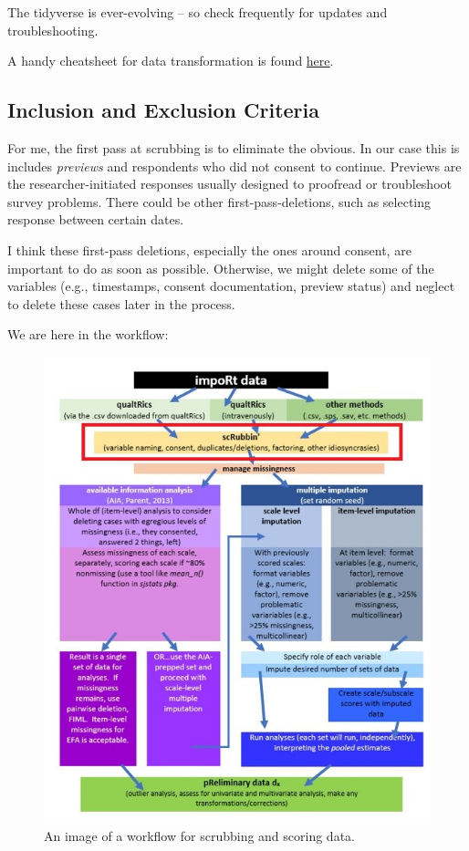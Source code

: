 \documentclass[
  11pt,
]{book}
\begin{document}
The tidyverse is ever-evolving -- so check frequently for updates and troubleshooting.

A handy cheatsheet for data transformation is found \href{https://www.rstudio.com/wp-content/uploads/2015/02/data-wrangling-cheatsheet.pdf}{here}.

\hypertarget{inclusion-and-exclusion-criteria}{%
\subsection{Inclusion and Exclusion Criteria}\label{inclusion-and-exclusion-criteria}}

For me, the first pass at scrubbing is to eliminate the obvious. In our case this is includes \emph{previews} and respondents who did not consent to continue. Previews are the researcher-initiated responses usually designed to proofread or troubleshoot survey problems. There could be other first-pass-deletions, such as selecting response between certain dates.

I think these first-pass deletions, especially the ones around consent, are important to do as soon as possible. Otherwise, we might delete some of the variables (e.g., timestamps, consent documentation, preview status) and neglect to delete these cases later in the process.

We are here in the workflow:

\begin{figure}
\centering
\includegraphics{images/Ch02/wrkflow_prelim.jpg}
\caption{An image of a workflow for scrubbing and scoring data.}
\end{figure}
\end{document}
